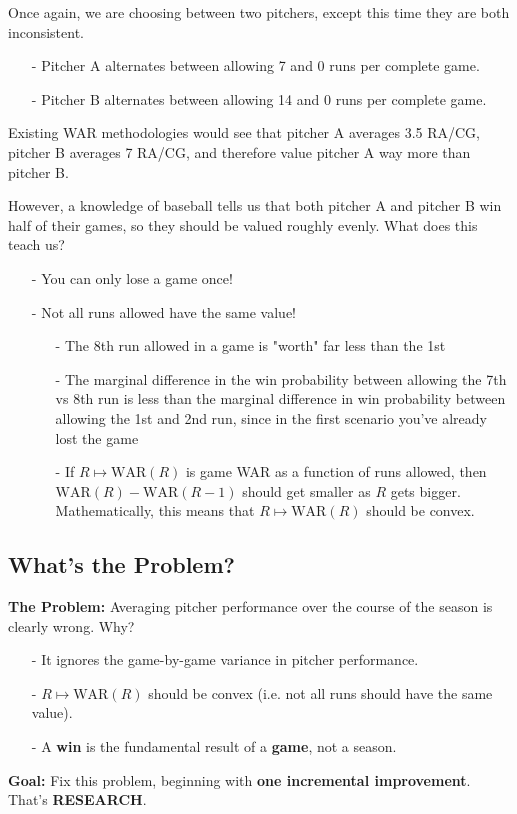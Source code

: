 \documentclass[twoside]{article}
\theoremstyle{definition}
\begin{document}
Once again, we are choosing between two pitchers, except this time they are both inconsistent.
\begin{itemize}
    \item[-] Pitcher A alternates between allowing 7 and 0 runs per complete game.
    \item[-] Pitcher B alternates between allowing 14 and 0 runs per complete game.
\end{itemize}
Existing WAR methodologies would see that pitcher A averages 3.5 RA/CG, pitcher B averages 7 RA/CG, and therefore value pitcher A way more than pitcher B.

However, a knowledge of baseball tells us that both pitcher A and pitcher B win half of their games, so they should be valued roughly evenly. What does this teach us?
\begin{enumerate}
    \item[-] You can only lose a game once!
    \item[-] Not all runs allowed have the same value!
    \begin{itemize}
        \item[-] The 8th run allowed in a game is "worth" far less than the 1st
        \item[-] The marginal difference in the win probability between allowing the 7th vs 8th run is less than the marginal difference in win probability between allowing the 1st and 2nd run, since in the first scenario you've already lost the game
        \item[-] If $R \mapsto \text{WAR}(R)$ is game WAR as a function of runs allowed, then $\text{WAR}(R) - \text{WAR}(R - 1)$ should get smaller as $R$ gets bigger. Mathematically, this means that $R \mapsto \text{WAR}(R)$ should be convex.
    \end{itemize}
\end{enumerate}
\subsection{What's the Problem?}
\color{red}

\textbf{The Problem:} Averaging pitcher performance over the course of the season is clearly wrong. Why?
\color{black}
\begin{itemize}
    \item[-] It ignores the game-by-game variance in pitcher performance.
    \item[-] $R \mapsto \text{WAR}(R)$ should be convex (i.e. not all runs should have the same value).
    \item[-] A \textbf{win} is the fundamental result of a \textbf{game}, not a season.
\end{itemize}
\textbf{Goal:} Fix this problem, beginning with \textbf{one incremental improvement}. That's \textbf{RESEARCH}.
\end{document}
